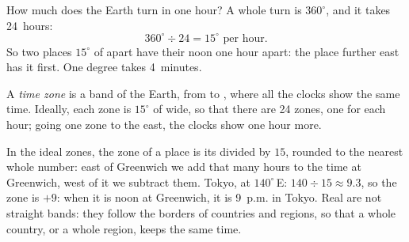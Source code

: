 How much does the Earth turn in one hour? A whole turn is $360^\circ$, and
it takes 24~hours:
\[
360^\circ \div 24 = 15^\circ \text{ per hour.}
\]
So two places $15^\circ$ of  apart have their noon one hour apart:
the place further east has it first. One degree takes 4~minutes.

\begin{definition}\label{def:g6:latitude-longitude:time-zone}
A \emph{time zone} is a band of the Earth, from  to
, where all the clocks show the same time. Ideally, each zone is
$15^\circ$ of  wide, so that there are 24 zones, one for each
hour; going one zone to the east, the clocks show one hour more.
\end{definition}

In the ideal zones, the zone of a place is its  divided by $15$,
rounded to the nearest whole number: east of Greenwich we add that many
hours to the time at Greenwich, west of it we subtract them. Tokyo, at
$140^\circ$\,E: $140 \div 15 \approx 9.3$, so the zone is $+9$: when it is
noon at Greenwich, it is 9~p.m. in Tokyo. Real  are not straight
bands: they follow the borders of countries and regions, so that a whole
country, or a whole region, keeps the same time.

